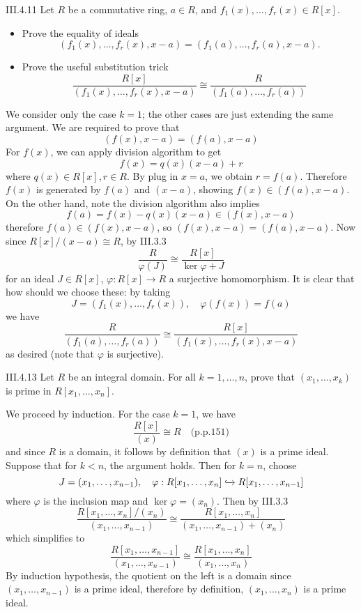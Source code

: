 \begin{problem}{III.4.11}
Let $R$ be a commutative ring, $a \in R$, and $f_1(x),\dotsc,f_r(x) \in R[x]$.
\begin{itemize}
\setlength\itemsep{0pt}
\item Prove the equality of ideals
\[
(f_1(x),\dotsc,f_r(x),x-a) = (f_1(a),\dotsc,f_r(a),x-a).
\]
\item Prove the useful substitution trick
\[
\frac{R[x]}{(f_1(x),\dotsc,f_r(x),x-a)} \cong \frac{R}{(f_1(a),\dotsc,f_r(a))}
\]
\end{itemize}
\end{problem}
\begin{pf}
We consider only the case $k = 1$; the other cases are just extending the same argument. We are required to prove that 
\[
(f(x), x-a) = (f(a), x-a)
\]
For $f(x)$, we can apply division algorithm to get
\[
f(x) = q(x)(x-a) + r
\]
where $q(x) \in R[x], r \in R$. By plug in $x = a$, we obtain $r = f(a)$. Therefore $f(x)$ is generated by $f(a)$ and $(x-a)$, showing $f(x)\in (f(a), x-a)$. On the other hand, note the division algorithm also implies
\[
f(a) = f(x) - q(x)(x-a) \in (f(x), x-a)
\]
therefore $f(a) \in (f(x), x-a)$, so $(f(x), x-a) = (f(a), x-a)$. Now since $R[x]/(x-a) \cong R$, by III.3.3
\[
\frac{R}{\varphi(J)} \cong \frac{R[x]}{\ker \varphi + J}	
\]
for an ideal $J \in R[x]$, $\varphi : R[x] \to R$ a surjective homomorphism. It is clear that how should we choose these: by taking
\[
J = (f_1(x),\dotsc,f_r(x)), \quad \varphi(f(x)) = f(a)	
\]
we have
\[
\frac{R}{(f_1(a),\dotsc,f_r(a))} \cong \frac{R[x]}{(f_1(x),\dotsc,f_r(x),x-a)} 
\]
as desired (note that $\varphi$ is surjective).
\end{pf}

\begin{problem}{III.4.13}
Let $R$ be an integral domain. For all $k = 1,\dotsc, n$, prove that $(x_1,\dotsc, x_k)$ is prime in $R[x_1,\dotsc, x_n]$.
\end{problem}
\begin{pf}
We proceed by induction. For the case $k = 1$, we have
\[
\frac{R[x]}{(x)} \cong R	\quad \text{(p.p.151)}
\]
and since $R$ is a domain, it follows by definition that $(x)$ is a prime ideal. Suppose that for $k < n$, the argument holds. Then for $k = n$, choose
\[
J = (x_1,\dotsc,x_{n-1}), \quad \varphi : R[x_1,\dotsc,x_{n}] \xhookrightarrow{} R[x_1,\dotsc,x_{n-1}]
\]
where $\varphi$ is the inclusion map and $\ker \varphi = (x_n)$. Then by III.3.3
\[
\frac{R[x_1,\dotsc,x_{n}]/(x_n)}{(x_1,\dotsc,x_{n-1})} \cong \frac{R[x_1,\dotsc,x_{n}]}{(x_1,\dotsc,x_{n-1})+(x_n)}
\]
which simplifies to
\[
\frac{R[x_1,\dotsc,x_{n-1}]}{(x_1,\dotsc,x_{n-1})} \cong \frac{R[x_1,\dotsc,x_{n}]}{(x_1,\dotsc,x_n)}	
\]
By induction hypothesis, the quotient on the left is a domain since $(x_1,\dotsc,x_{n-1})$ is a prime ideal, therefore by definition, $(x_1,\dotsc,x_n)$ is a prime ideal.
\end{pf}


